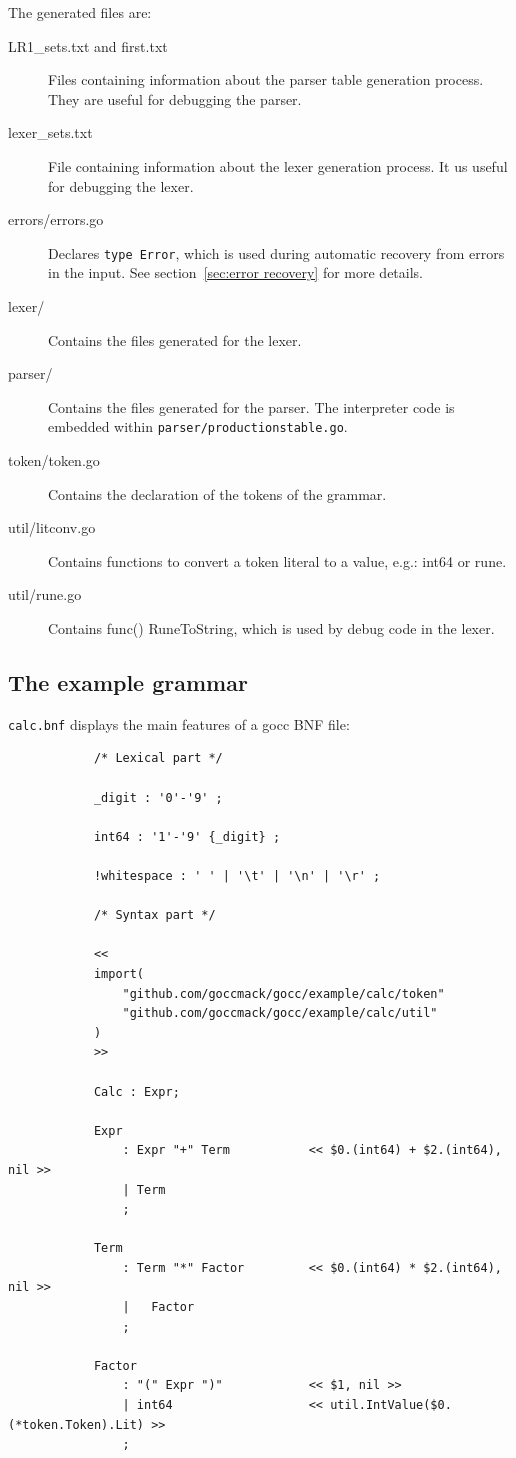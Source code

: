\documentclass[12pt]{article}
\begin{document}
		The generated files are:
		\begin{description}
			\item[LR1\_sets.txt and first.txt] Files containing information about the parser table generation process. They are useful for debugging the parser.

			\item[lexer\_sets.txt] File containing information about the lexer generation process. It us useful for debugging the lexer.

			\item[errors/errors.go] Declares \verb|type Error|, which is used during automatic recovery from errors in the input. See section~\ref{sec:error recovery} for more details.

			\item[lexer/] Contains the files generated for the lexer.

			\item[parser/] Contains the files generated for the parser. The interpreter code is embedded within \verb|parser/productionstable.go|.

			\item[token/token.go] Contains the declaration of the tokens of the grammar.

			\item[util/litconv.go] Contains functions to convert a token literal to a value, e.g.: int64 or rune.

			\item[util/rune.go] Contains func() RuneToString, which is used by debug code in the lexer.
		\end{description}

	\subsection{The example grammar}
		\verb|calc.bnf| displays the main features of a gocc BNF file:

		\begin{verbatim}
			/* Lexical part */

			_digit : '0'-'9' ;

			int64 : '1'-'9' {_digit} ;

			!whitespace : ' ' | '\t' | '\n' | '\r' ;

			/* Syntax part */

			<<
			import(
			    "github.com/goccmack/gocc/example/calc/token"
			    "github.com/goccmack/gocc/example/calc/util"
			)
			>>

			Calc : Expr;

			Expr
			    : Expr "+" Term           << $0.(int64) + $2.(int64), nil >>
			    | Term
			    ;

			Term
			    : Term "*" Factor         << $0.(int64) * $2.(int64), nil >>
			    |	Factor
			    ;

			Factor
			    : "(" Expr ")"            << $1, nil >>
			    | int64                   << util.IntValue($0.(*token.Token).Lit) >>
			    ;

		\end{verbatim}
\end{document}
